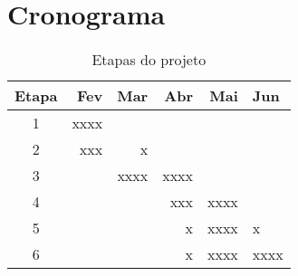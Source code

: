 \section{Cronograma}

\begin{table}
\caption{Etapas do projeto}
\centering
\begin{tabular}{c r r r r l}
Etapa  & Fev  & Mar  & Abr  & Mai & Jun \\
\hline
1      & xxxx &      &      &      &      \\
2      &  xxx &    x &      &      &      \\
3      &      & xxxx & xxxx &      &      \\
4      &      &      &  xxx & xxxx &      \\
5      &      &      &    x & xxxx & x    \\
6      &      &      &    x & xxxx & xxxx \\
\hline
\end{tabular}
\end{table}
